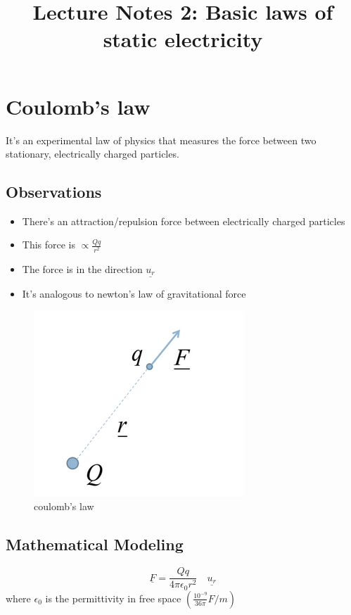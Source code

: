 \documentclass[12 pt]{article}
\title{\huge{Lecture Notes 2: Basic laws of static electricity}}
\author{}
\date{}
\begin{document}
\maketitle
\tableofcontents
\newpage
\section{Coulomb's law}
It's an experimental law of physics that measures the force between two stationary, electrically charged particles.
\subsection{Observations}
\begin{minipage}{0.6\linewidth}
\begin{itemize}
    \item There's an attraction/repulsion force between electrically charged particles
    \item This force is $\propto \frac{Qq}{r^2}$
    \item The force is in the direction $\underline{u_r}$
    \item It's analogous to newton's law of gravitational force
\end{itemize}
\end{minipage}
\begin{minipage}{0.38\linewidth}
    \begin{figure}[H]
    \centering
    \includegraphics[scale=0.35]{./images/coul1}
    \caption{coulomb's law}
    \label{coul1} 
\end{figure}
\end{minipage}
\subsection{Mathematical Modeling}
$$\underline{F}=\frac{Qq}{4\pi \epsilon_{0} r^2}\quad \underline{u_r}$$
where $\epsilon_0$ is the permittivity in free space $\left(\frac{10^{-9}}{36\pi} F/m \right)$
\end{document}
